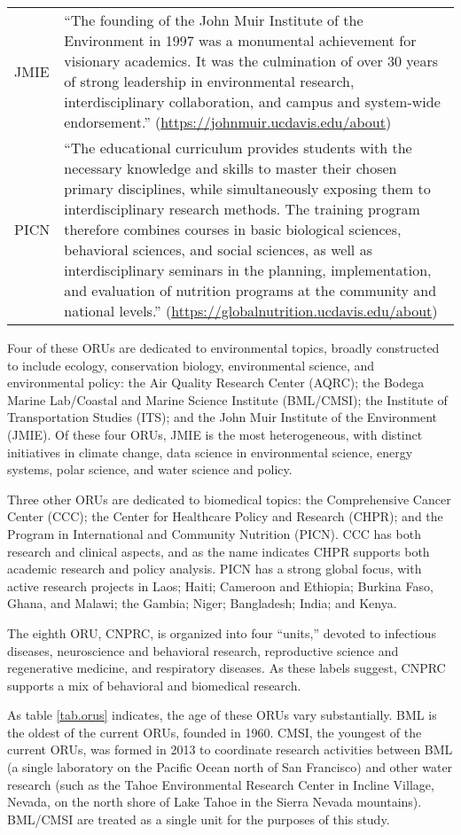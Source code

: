 \documentclass[
  11pt,
]{article}
\begin{document}
\begin{longtable}[]{@{}
  >{\raggedright\arraybackslash}p{}
  >{\raggedright\arraybackslash}p{}@{}}
JMIE & ``The founding of the John Muir Institute of the Environment in 1997 was a monumental achievement for visionary academics. It was the culmination of over 30 years of strong leadership in environmental research, interdisciplinary collaboration, and campus and system-wide endorsement.'' (\url{https://johnmuir.ucdavis.edu/about}) \\
PICN & ``The educational curriculum provides students with the necessary knowledge and skills to master their chosen primary disciplines, while simultaneously exposing them to interdisciplinary research methods. The training program therefore combines courses in basic biological sciences, behavioral sciences, and social sciences, as well as interdisciplinary seminars in the planning, implementation, and evaluation of nutrition programs at the community and national levels.'' (\url{https://globalnutrition.ucdavis.edu/about}) \\
\bottomrule
\end{longtable}

Four of these ORUs are dedicated to environmental topics, broadly constructed to include ecology, conservation biology, environmental science, and environmental policy: the Air Quality Research Center (AQRC); the Bodega Marine Lab/Coastal and Marine Science Institute (BML/CMSI); the Institute of Transportation Studies (ITS); and the John Muir Institute of the Environment (JMIE). Of these four ORUs, JMIE is the most heterogeneous, with distinct initiatives in climate change, data science in environmental science, energy systems, polar science, and water science and policy.

Three other ORUs are dedicated to biomedical topics: the Comprehensive Cancer Center (CCC); the Center for Healthcare Policy and Research (CHPR); and the Program in International and Community Nutrition (PICN). CCC has both research and clinical aspects, and as the name indicates CHPR supports both academic research and policy analysis. PICN has a strong global focus, with active research projects in Laos; Haiti; Cameroon and Ethiopia; Burkina Faso, Ghana, and Malawi; the Gambia; Niger; Bangladesh; India; and Kenya.

The eighth ORU, CNPRC, is organized into four ``units,'' devoted to infectious diseases, neuroscience and behavioral research, reproductive science and regenerative medicine, and respiratory diseases. As these labels suggest, CNPRC supports a mix of behavioral and biomedical research.

As table \ref{tab.orus} indicates, the age of these ORUs vary substantially. BML is the oldest of the current ORUs, founded in 1960. CMSI, the youngest of the current ORUs, was formed in 2013 to coordinate research activities between BML (a single laboratory on the Pacific Ocean north of San Francisco) and other water research (such as the Tahoe Environmental Research Center in Incline Village, Nevada, on the north shore of Lake Tahoe in the Sierra Nevada mountains). BML/CMSI are treated as a single unit for the purposes of this study.
\end{document}
